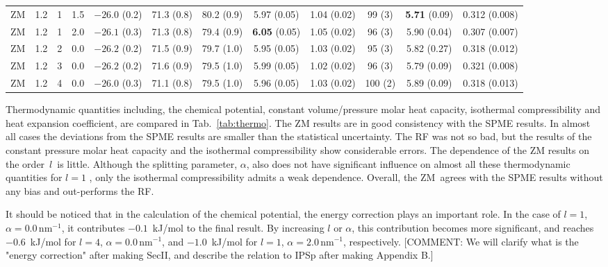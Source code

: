 \documentclass[a4paper,preprint,unsortedaddress,onecolumn,fleqn]{revtex4}
\begin{document}
\begin{sidewaystable}
\begin{tabular*}{0.99\textwidth}{@{\extracolsep{\fill}}cccc cccccccc}
    ZM          &1.2 & 1  &1.5 & $-26.0$ (0.2) & 71.3 (0.8)  &80.2 (0.9)           & 5.97 (0.05)               &1.04 (0.02)          & 99 (3)          & \textbf{5.71} (0.09)&        {0.312} (0.008)\\ 
    ZM          &1.2 & 1  &2.0 & $-26.1$ (0.3) & 71.3 (0.8)  &79.4 (0.9)           & \textbf{6.05} (0.05)      &1.05 (0.02)          & 96 (3)          &        {5.90} (0.04)&        {0.307} (0.007)\\\hline
    ZM          &1.2 & 2  &0.0 & $-26.2$ (0.2) & 71.5 (0.9)  &79.7 (1.0)           & 5.95 (0.05)               &1.03 (0.02)          & 95 (3)          &         5.82  (0.27)&         0.318  (0.012)\\
    ZM          &1.2 & 3  &0.0 & $-26.2$ (0.2) & 71.6 (0.9)  &79.5 (1.0)           & 5.99 (0.05)               &1.02 (0.02)          & 96 (3)          &         5.79  (0.09)&         0.321  (0.008)\\
    ZM          &1.2 & 4  &0.0 & $-26.0$ (0.3) & 71.1 (0.8)  &79.5 (1.0)           & 5.96 (0.05)               &1.03 (0.02)          &100 (2)          &         5.89  (0.09)&         0.318  (0.013)\\
    \hline\hline
  \end{tabular*}
  \label{tab:thermo}
\end{sidewaystable}

Thermodynamic quantities including, the chemical potential, constant
volume/pressure molar heat capacity, isothermal compressibility and heat
expansion coefficient, are compared in Tab.~\ref{tab:thermo}. The ZM results
are in good consistency with the SPME results. In almost all cases the
deviations from the SPME results are smaller than the statistical
uncertainty. The RF was not so bad, but the results of the constant pressure
molar heat capacity and the isothermal compressibility show considerable
errors. The dependence of the ZM results on the order\ $l$\ is {\color{red}
little}. Although the splitting parameter, $\alpha $, also does not have
significant influence on almost all these thermodynamic quantities for $l=1$%
, only the isothermal compressibility admits a weak dependence. Overall, the ZM\
agrees with the SPME results without any bias and out-performs the RF.

{\color{red} It should be noticed that in the calculation of the chemical
potential, the energy correction plays an important role. In the case of $%
l=1 $, $\alpha =0.0\,\text{nm}^{-1}$, it contributes $-0.1$~kJ/mol to the
final result. By increasing $l$ or $\alpha $, this contribution becomes more
significant, and reaches $-0.6$~kJ/mol for $l=4$, $\alpha =0.0\,\text{nm}%
^{-1}$, and $-1.0$~kJ/mol for $l=1$, $\alpha =2.0\,\text{nm}^{-1}$,
respectively. [\color{blue}COMMENT: We will clarify what is the "energy
correction" after making SecII, and describe the relation to IPSp after
making Appendix B.] }
\end{document}
